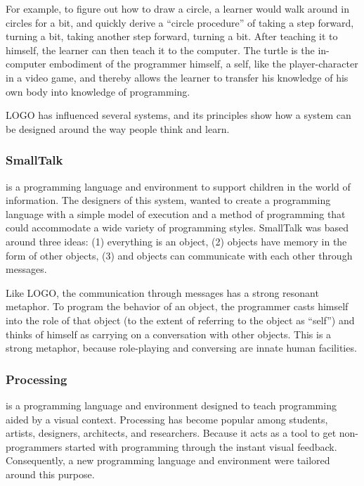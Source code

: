 For example, to figure out how to draw a circle, a learner would walk around in circles for a bit, and quickly derive a ``circle procedure'' of taking a step forward, turning a bit, taking another step forward, turning a bit. After teaching it to himself, the learner can then teach it to the computer. The turtle is the in-computer embodiment of the programmer himself, a self, like the player-character in a video game, and thereby allows the learner to transfer his knowledge of his own body into knowledge of programming.

LOGO has influenced several systems, and its principles show how a system can be designed around the way people think and learn.
\subsubsection{SmallTalk~\cite{Kay1993}} is a programming language and environment to support children in the world of information. The designers of this system, wanted to create a programming language with a simple model of execution and a method of programming that could accommodate a wide variety of programming styles. SmallTalk was based around three ideas: (1) everything is an object, (2) objects have memory in the form of other objects, (3) and objects can communicate with each other through messages.

Like LOGO, the communication through messages has a strong resonant metaphor. To program the behavior of an object, the programmer casts himself into the role of that object (to the extent of referring to the object as ``self'') and thinks of himself as carrying on a conversation with other objects. This is a strong metaphor, because role-playing and conversing are innate human facilities. 
\subsubsection{Processing~\cite{Reas2006}} is a programming language and environment designed to teach programming aided by a visual context. Processing has become popular among students, artists, designers, architects, and researchers. Because it acts as a tool to get non-programmers started with programming through the instant visual feedback. Consequently, a new programming language and environment were tailored around this purpose.

